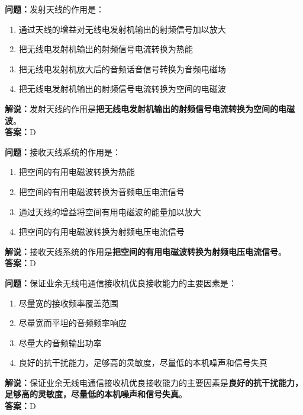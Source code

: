 \textbf{问题：}发射天线的作用是：

\begin{enumerate}[label=\Alph*), leftmargin=1.5cm]
	\item 通过天线的增益对无线电发射机输出的射频信号加以放大
	\item 把无线电发射机输出的射频信号电流转换为热能
	\item 把无线电发射机放大后的音频话音信号转换为音频电磁场
	\item 把无线电发射机输出的射频信号电流转换为空间的电磁波
\end{enumerate}

\textbf{解说：}发射天线的作用是\textbf{把无线电发射机输出的射频信号电流转换为空间的电磁波}。\\\textbf{答案：}D%



\textbf{问题：}接收天线系统的作用是：

\begin{enumerate}[label=\Alph*), leftmargin=1.5cm]
	\item 把空间的有用电磁波转换为热能
	\item 把空间的有用电磁波转换为音频电压电流信号
	\item 通过天线的增益将空间有用电磁波的能量加以放大
	\item 把空间的有用电磁波转换为射频电压电流信号
\end{enumerate}

\textbf{解说：}接收天线系统的作用是\textbf{把空间的有用电磁波转换为射频电压电流信号}。\\\textbf{答案：}D%



\textbf{问题：}保证业余无线电通信接收机优良接收能力的主要因素是：

\begin{enumerate}[label=\Alph*), leftmargin=1.5cm]
	\item 尽量宽的接收频率覆盖范围
	\item 尽量宽而平坦的音频频率响应
	\item 尽量大的音频输出功率
	\item 良好的抗干扰能力，足够高的灵敏度，尽量低的本机噪声和信号失真
\end{enumerate}

\textbf{解说：}保证业余无线电通信接收机优良接收能力的主要因素是\textbf{良好的抗干扰能力，足够高的灵敏度，尽量低的本机噪声和信号失真}。\\\textbf{答案：}D%



